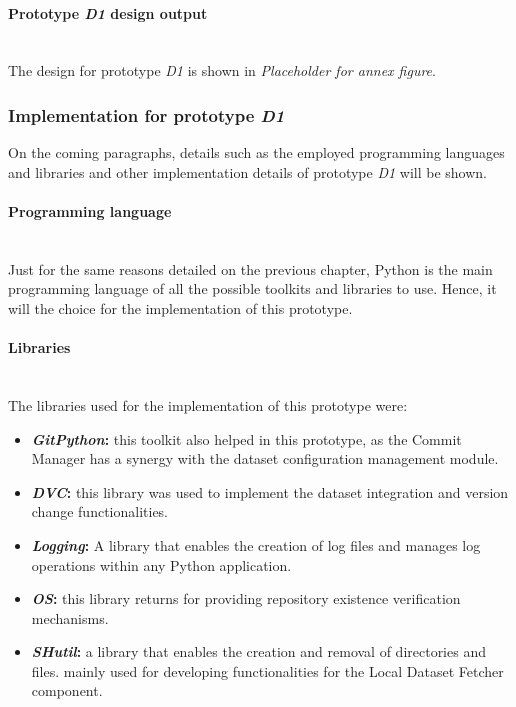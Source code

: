 \paragraph{Prototype \emph{D1} design output}\mbox{}\\

The design for prototype \emph{D1} is shown in \emph{Placeholder for annex figure}.

\subsubsection{Implementation for prototype \emph{D1}}

On the coming paragraphs, details such as the employed programming languages and libraries and other implementation details of prototype \emph{D1} will be shown.

\paragraph{Programming language} \mbox{}\\

Just for the same reasons detailed on the previous chapter, Python is the main programming language of all the possible toolkits and libraries to use. Hence, it will
the choice for the implementation of this prototype.

\paragraph{Libraries} \mbox{}\\

The libraries used for the implementation of this prototype were:

\begin{itemize}
    \item \textbf{\emph{GitPython}: }this toolkit also helped in this prototype, as the Commit Manager has a synergy with the dataset configuration management module.
    \item \textbf{\emph{DVC}: }this library was used to implement the dataset integration and version change functionalities.
    \item \textbf{\emph{Logging}: }A library that enables the creation of log files and manages log operations within any Python application.
    \item \textbf{\emph{OS}: }this library returns for providing repository existence verification mechanisms.
    \item \textbf{\emph{SHutil}: }a library that enables the creation and removal of directories and files. mainly used for developing functionalities for the Local Dataset Fetcher component.
\end{itemize}

